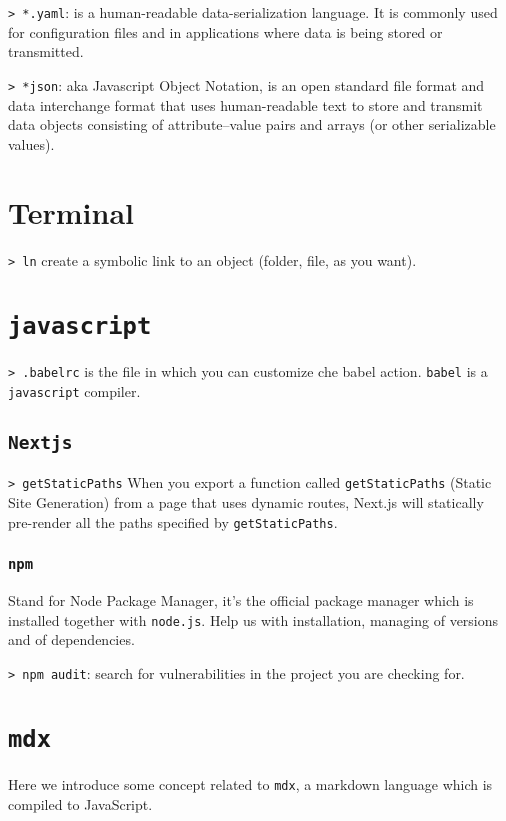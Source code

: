 \documentclass[11pt]{article}
\newcommand{\cmd}[1]{\colorbox{light-gray}{\textcolor{gio}{\texttt{#1}}}}
\begin{document}
\begin{multicols}{2}
\cmd{> *.yaml}: is a human-readable data-serialization language. It is commonly used for configuration files and in applications where data is being stored or transmitted.

\cmd{> *json}: aka Javascript Object Notation, is an open standard file format and data interchange format that uses human-readable text to store and transmit data objects consisting of attribute–value pairs and arrays (or other serializable values). 

\section{Terminal}

\cmd{> ln} create a symbolic link to an object (folder, file, as you want).

\section{\texttt{javascript}}

\cmd{> .babelrc} is the file in which you can customize che babel action. \texttt{babel} is a \texttt{javascript} compiler.

\subsection{\texttt{Nextjs}}

\cmd{> getStaticPaths} When you export a function called \texttt{getStaticPaths} (Static Site Generation) from a page that uses dynamic routes, Next.js will statically pre-render all the paths specified by \texttt{getStaticPaths}.
\subsubsection{\texttt{npm}}
Stand for Node Package Manager, it's the official package manager which is installed together with \texttt{node.js}. Help us with installation, managing of versions and of dependencies.

\cmd{> npm audit}: search for vulnerabilities in the project you are checking for.

\section{\texttt{mdx}}

Here we introduce some concept related to \texttt{mdx}, a markdown language which is compiled to JavaScript. \\


\end{multicols}
\end{document}
